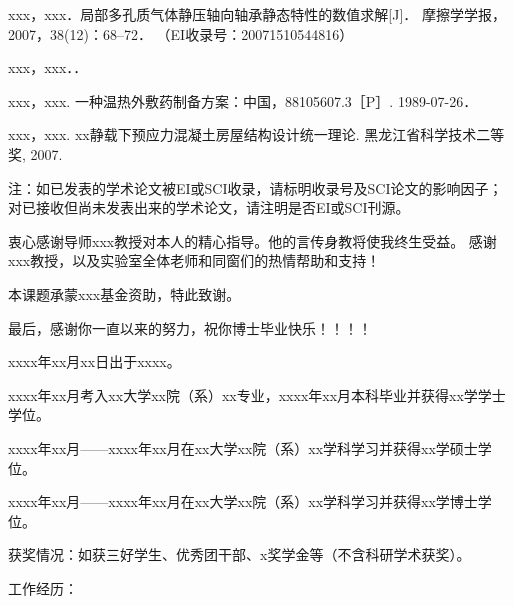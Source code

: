 \documentclass[a4paper, twoside, openany]{NCEPUDoctor}
\begin{document}

  \begin{achievementlist}
  \item[ {[1]} ]
  xxx，xxx．局部多孔质气体静压轴向轴承静态特性的数值求解[J]．
  摩擦学学报，2007，38(12)：68--72．
  （EI收录号：20071510544816）
  \item[ {[2]} ]
  xxx，xxx．．
  \end{achievementlist}


  \begin{achievementlist}
  \item[ {[1]} ]
  xxx，xxx. 一种温热外敷药制备方案：中国，88105607.3［P］. 1989-07-26．
  \end{achievementlist}

  \begin{achievementlist}
  \item[ {[1]} ]
  xxx，xxx. xx静载下预应力混凝土房屋结构设计统一理论. 黑龙江省科学技术二等奖, 2007.
  \end{achievementlist}

  注：如已发表的学术论文被EI或SCI收录，请标明收录号及SCI论文的影响因子；对已接收但尚未发表出来的学术论文，请注明是否EI或SCI刊源。
  \clearpage

  \clearpage

  \begin{achievementlist}
  \item[ {[1]} ]

  \item[ {[2]} ]

  \end{achievementlist}
  \clearpage

  \clearpage

  衷心感谢导师xxx教授对本人的精心指导。他的言传身教将使我终生受益。
  感谢xxx教授，以及实验室全体老师和同窗们的热情帮助和支持！

  本课题承蒙xxx基金资助，特此致谢。

  最后，感谢你一直以来的努力，祝你博士毕业快乐！！！！
  \clearpage

  \clearpage

  xxxx年xx月xx日出于xxxx。

  xxxx年xx月考入xx大学xx院（系）xx专业，xxxx年xx月本科毕业并获得xx学学士学位。

  xxxx年xx月——xxxx年xx月在xx大学xx院（系）xx学科学习并获得xx学硕士学位。

  xxxx年xx月——xxxx年xx月在xx大学xx院（系）xx学科学习并获得xx学博士学位。

  获奖情况：如获三好学生、优秀团干部、x奖学金等（不含科研学术获奖）。

  工作经历：
  \clearpage
\end{document}
